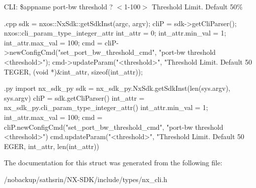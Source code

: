CLI: \$appname port-\/bw threshold ? $<$1-\/100$>$ Threshold Limit. Default 50\%


\begin{DoxyCode}
 {.cpp}
       sdk = nxos::NxSdk::getSdkInst(argc, argv);
       cliP = sdk->getCliParser();
       nxos::cli_param_type_integer_attr int_attr = {0};
       int_attr.min_val = 1;
       int_attr.max_val = 100;
       cmd = cliP->newConfigCmd("set_port_bw_threshold_cmd",
                                "port-bw threshold <threshold>");
       cmd->updateParam("<threshold>", "Threshold Limit. Default 50%
      TEGER,
                        (void *)&int_attr, sizeof(int_attr));
\end{DoxyCode}



\begin{DoxyCode}
 {.py}
       import nx_sdk_py
       sdk = nx_sdk_py.NxSdk.getSdkInst(len(sys.argv), sys.argv)
       cliP = sdk.getCliParser()
       int_attr = nx_sdk_py.cli_param_type_integer_attr()
       int_attr.min_val = 1;
       int_attr.max_val = 100;
       cmd = cliP.newConfigCmd("set_port_bw_threshold_cmd", 
                               "port-bw threshold <threshold>")
       cmd.updateParam("<threshold>", "Threshold Limit. Default 50%
      EGER,
                       int_attr, len(int_attr))
\end{DoxyCode}
 

The documentation for this struct was generated from the following file:\begin{DoxyCompactItemize}
\item 
/nobackup/sathsrin/NX-\/SDK/include/types/nx\_\-cli.h\end{DoxyCompactItemize}
